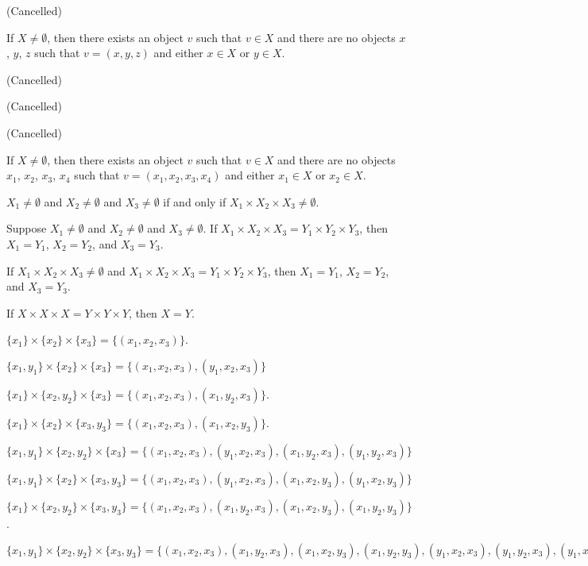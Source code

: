 \documentclass{article}
\begin{document}
\begin{thm}
\item\label{mcart1:25} (Cancelled)
\item\label{mcart1:26} If $X\neq\emptyset$, then there exists an object
  $v$ such that $v\in X$ and there are no objects $x$, $y$, $z$ such
  that $v=(x,y,z)$ and either $x\in X$ or $y\in X$.
\item\label{mcart1:27} (Cancelled)
\item\label{mcart1:28} (Cancelled)
\item\label{mcart1:29} (Cancelled)
\item\label{mcart1:30} If $X\neq\emptyset$, then there exists an object
  $v$ such that $v\in X$ and there are no objects $x_{1}$, $x_{2}$,
  $x_{3}$, $x_{4}$ such
  that $v=(x_{1},x_{2},x_{3},x_{4})$ and either $x_{1}\in X$ or $x_{2}\in X$.
\item\label{mcart1:31} $X_{1}\neq\emptyset$ and $X_{2}\neq\emptyset$ and
  $X_{3}\neq\emptyset$ if and only if $X_{1}\times X_{2}\times X_{3}\neq\emptyset$.
\item\label{mcart1:32} Suppose $X_{1}\neq\emptyset$ and $X_{2}\neq\emptyset$ and
  $X_{3}\neq\emptyset$. If $X_{1}\times X_{2}\times X_{3}=Y_{1}\times Y_{2}\times Y_{3}$,
  then $X_{1}=Y_{1}$, $X_{2}=Y_{2}$, and $X_{3}=Y_{3}$.
\item\label{mcart1:33} If $X_{1}\times X_{2}\times X_{3}\neq\emptyset$
  and $X_{1}\times X_{2}\times X_{3}=Y_{1}\times Y_{2}\times Y_{3}$,
  then $X_{1}=Y_{1}$, $X_{2}=Y_{2}$, and $X_{3}=Y_{3}$.
\item\label{mcart1:34} If $X\times X\times X=Y\times Y\times Y$, then $X=Y$.
\item\label{mcart1:35} $\{x_{1}\}\times\{x_{2}\}\times\{x_{3}\}=\{(x_{1},x_{2},x_{3})\}$.
\item\label{mcart1:36} $\{x_1,y_1\}\times\{x_2\}\times\{x_3\}=\{ (x_1,x_2,x_3),(y_1,x_2,x_3) \}$
\item\label{mcart1:37} $\{x_{1}\}\times\{x_{2},y_{2}\}\times\{x_{3}\}=\{(x_{1},x_{2},x_{3}),(x_{1},y_{2},x_{3})\}$.
\item\label{mcart1:38} $\{x_{1}\}\times\{x_{2}\}\times\{x_{3},y_{3}\}=\{(x_{1},x_{2},x_{3}),(x_{1},x_{2},y_{3})\}$.
\item\label{mcart1:39} $\{x_1,y_1\}\times\{x_2,y_{2}\}\times\{x_3\}=\{ (x_1,x_2,x_3),(y_1,x_2,x_3),(x_1,y_2,x_3),(y_1,y_2,x_3) \}$
\item\label{mcart1:40} $\{x_1,y_1\}\times\{x_2\}\times\{x_3,y_{3}\}=\{ (x_1,x_2,x_3),(y_1,x_2,x_3),(x_1,x_2,y_3),(y_1,x_2,y_3) \}$
\item\label{mcart1:41} $\{x_{1}\}\times\{x_{2},y_{2}\}\times\{x_{3},y_{3}\}=\{(x_{1},x_{2},x_{3}),(x_{1},y_{2},x_{3}),(x_{1},x_{2},y_{3}),(x_{1},y_{2},y_{3})\}$.
\item\label{mcart1:42} $\{x_1,y_1\}\times\{x_2,y_{2}\}\times\{x_3,y_{3}\}=\{ (x_1,x_2,x_3),(x_1,y_2,x_3),(x_{1},x_{2},y_{3}),(x_{1},y_{2},y_{3}),(y_1,x_2,x_3),(y_1,y_2,x_3),(y_{1},x_{2},y_{3}),(y_{1},y_{2},y_{3}) \}$
\end{thm}
\end{document}
